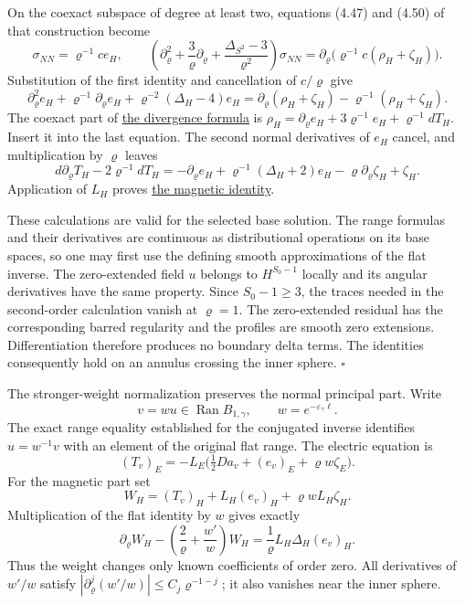 \documentclass[
  english,
  11pt,
  reqno]{amsart}
\begin{document}
On the coexact subspace of degree at least two, equations (4.47) and
(4.50) of that construction become%
 \[
\sigma_{NN}=\varrho^{-1}ce_H,
\qquad
\left(\partial_\varrho^2+\frac3\varrho\partial_\varrho
           +\frac{\Delta_{S^2}-3}{\varrho^2}\right)\sigma_{NN}
 =\partial_\varrho
       \bigl(\varrho^{-1}c(\rho_H+\zeta_H)\bigr).
\] Substitution of the first identity and cancellation of \(c/\varrho\)
give \[
\partial_\varrho^2e_H+\varrho^{-1}\partial_\varrho e_H
 +\varrho^{-2}(\Delta_H-4)e_H
 =\partial_\varrho(\rho_H+\zeta_H)
                         -\varrho^{-1}(\rho_H+\zeta_H).
\] The coexact part of
\hyperref[eq:online-momentum-radial-divergence]{the divergence formula}
is \(\rho_H=\partial_\varrho e_H+3\varrho^{-1}e_H+\varrho^{-1}dT_H\).
Insert it into the last equation. The second normal derivatives of
\(e_H\) cancel, and multiplication by \(\varrho\) leaves \[
d\partial_\varrho T_H-2\varrho^{-1}dT_H
 =-\partial_\varrho e_H+\varrho^{-1}(\Delta_H+2)e_H
                    -\varrho\partial_\varrho\zeta_H+\zeta_H.
\] Application of \(L_H\) proves
\hyperref[eq:online-momentum-magnetic-range]{the magnetic identity}.

These calculations are valid for the selected base solution. The range
formulas and their derivatives are continuous as distributional
operations on its base spaces, so one may first use the defining smooth
approximations of the flat inverse. The zero-extended field \(u\)
belongs to \(H^{S_0-1}\) locally and its angular derivatives have the
same property. Since \(S_0-1\ge3\), the traces needed in the
second-order calculation vanish at \(\varrho=1\). The zero-extended
residual has the corresponding barred regularity and the profiles are
smooth zero extensions. Differentiation therefore produces no boundary
delta terms. The identities consequently hold on an annulus crossing the
inner sphere. \hfill\(\square\)

The stronger-weight normalization preserves the normal principal part.
Write \[
v=w u\in\operatorname{Ran}B_{1,\gamma},
\qquad w=e^{-\varepsilon_\gamma\ell}.
\] The exact range equality established for the conjugated inverse
identifies \(u=w^{-1}v\) with an element of the original flat range. The
electric equation is%
 \[
(T_v)_E
 =-L_E\bigl(\tfrac12Da_v+(e_v)_E
                              +\varrho w\zeta_E\bigr).
\] For the magnetic part set%
 \[
W_H=(T_v)_H+L_H(e_v)_H+\varrho wL_H\zeta_H.
\] Multiplication of the flat identity by \(w\) gives exactly%
 \[
\partial_\varrho W_H
 -\left(\frac2\varrho+\frac{w'}w\right)W_H
 =\frac1\varrho L_H\Delta_H(e_v)_H.
\] Thus the weight changes only known coefficients of order zero. All
derivatives of \(w'/w\) satisfy
\(|\partial_\varrho^j(w'/w)|\le C_j\varrho^{-1-j}\); it also vanishes
near the inner sphere.
\end{document}
